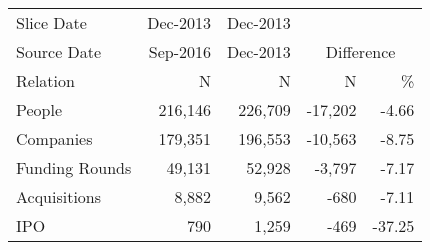 \begin{tabular}{lrrrr} \toprule
Slice Date      & Dec-2013  & Dec-2013                                      \\
Source Date     & Sep-2016  & Dec-2013  & \multicolumn{2}{c}{Difference}    \\
Relation        & N         & N         & N         & \%                    \\ \midrule
People          & 216,146   & 226,709   & -17,202   & -4.66                 \\
Companies       & 179,351   & 196,553   & -10,563   & -8.75                 \\
Funding Rounds  & 49,131    & 52,928    & -3,797    & -7.17                 \\
Acquisitions    & 8,882     & 9,562     & -680      & -7.11                 \\
IPO             & 790       & 1,259     & -469      & -37.25                \\
\bottomrule \end{tabular}
